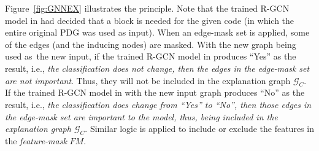 
Figure~\ref{fig:GNNEX} illustrates the principle. Note that the
trained R-GCN model in {\xblock} had decided that a 
block is needed for the given code (in which the entire original PDG
was used as input). When an edge-mask set is applied, some of the
edges (and the inducing nodes) are masked. With the new graph being
used as~the new input, if the trained R-GCN model in {\xblock}
produces ``Yes'' as the result, i.e., {\em the classification does not
change, then the edges in the edge-mask set are not important}. Thus,
they will not be included in the explanation graph $\mathcal{G}_C$. If
the trained R-GCN model in {\xblock} with the new input graph produces
``No'' as the result, i.e., {\em the classification does change from
``Yes'' to ``No'', then those edges in the edge-mask set are important
to the model, thus, being included in the explanation graph
$\mathcal{G}_C$}. Similar logic is applied to include or exclude the
features in the {\em feature-mask} $FM$.





